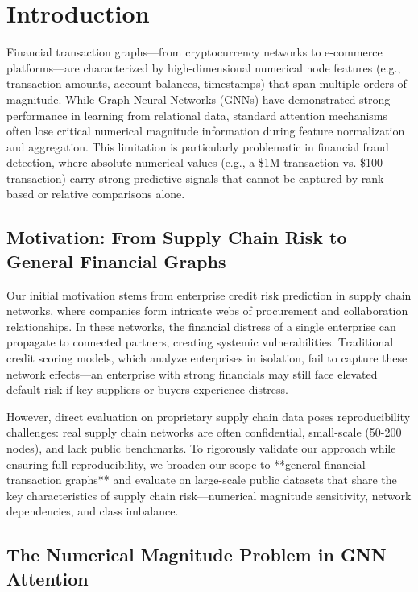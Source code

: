 \section{Introduction}

Financial transaction graphs---from cryptocurrency networks to e-commerce platforms---are characterized by high-dimensional numerical node features (e.g., transaction amounts, account balances, timestamps) that span multiple orders of magnitude. While Graph Neural Networks (GNNs) have demonstrated strong performance in learning from relational data, standard attention mechanisms often lose critical numerical magnitude information during feature normalization and aggregation. This limitation is particularly problematic in financial fraud detection, where absolute numerical values (e.g., a \$1M transaction vs. \$100 transaction) carry strong predictive signals that cannot be captured by rank-based or relative comparisons alone.

\subsection{Motivation: From Supply Chain Risk to General Financial Graphs}

Our initial motivation stems from enterprise credit risk prediction in supply chain networks, where companies form intricate webs of procurement and collaboration relationships. In these networks, the financial distress of a single enterprise can propagate to connected partners, creating systemic vulnerabilities. Traditional credit scoring models, which analyze enterprises in isolation, fail to capture these network effects---an enterprise with strong financials may still face elevated default risk if key suppliers or buyers experience distress.

However, direct evaluation on proprietary supply chain data poses reproducibility challenges: real supply chain networks are often confidential, small-scale (50-200 nodes), and lack public benchmarks. To rigorously validate our approach while ensuring full reproducibility, we broaden our scope to **general financial transaction graphs** and evaluate on large-scale public datasets that share the key characteristics of supply chain risk---numerical magnitude sensitivity, network dependencies, and class imbalance.

\subsection{The Numerical Magnitude Problem in GNN Attention}


